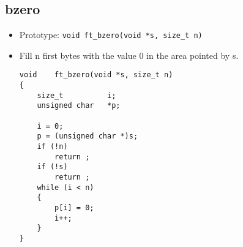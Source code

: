 \documentclass{article}
\begin{document}
		\subsection{bzero}
			\begin{itemize}[label=$\rightarrow$]
				\item Prototype: \texttt{void ft\_bzero(void *s, size\_t n)}
				\item Fill n first bytes with the value 0 in the area pointed by s.
				\begin{verbatim}
void    ft_bzero(void *s, size_t n)                                             
{                                                                               
    size_t          i;                                                          
    unsigned char   *p;                                                         
                                                                                
    i = 0;                                                                      
    p = (unsigned char *)s;                                                     
    if (!n)                                                                     
        return ;                                                                
    if (!s)                                                                     
        return ;                                                                
    while (i < n)                                                               
    {                                                                           
        p[i] = 0;                                                               
        i++;                                                                    
    }                                                                           
}   
				\end{verbatim}
			\end{itemize}
		
\end{document}
